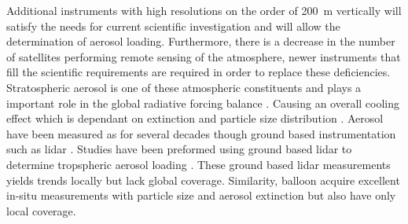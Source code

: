 \documentclass[12pt]{article}
\begin{document}

Additional instruments with high resolutions on the order of 200~m vertically will satisfy the needs for current scientific investigation and will allow the determination of aerosol loading. Furthermore, there is a decrease in the number of satellites performing remote sensing of the atmosphere, newer instruments that fill the scientific requirements are required in order to replace these deficiencies. Stratospheric aerosol is one of these atmospheric constituents and plays a important role in the global radiative forcing balance \citep{Stocker2013}. Causing an overall cooling effect which is dependant on extinction and particle size distribution \citep{Kiehl1993}. Aerosol have been measured as for several decades though ground based instrumentation such as lidar \citep{Hamilton1969}. Studies have been preformed using ground based lidar to determine tropspheric aerosol loading \citep{Takamura1994, Marenco1997, Krueger1993}. These ground based lidar measurements yields trends locally but lack global coverage. Similarity, balloon acquire excellent in-situ measurements with particle size and aerosol extinction \citep{Deshler2003} but also have only local coverage.
\end{document}
